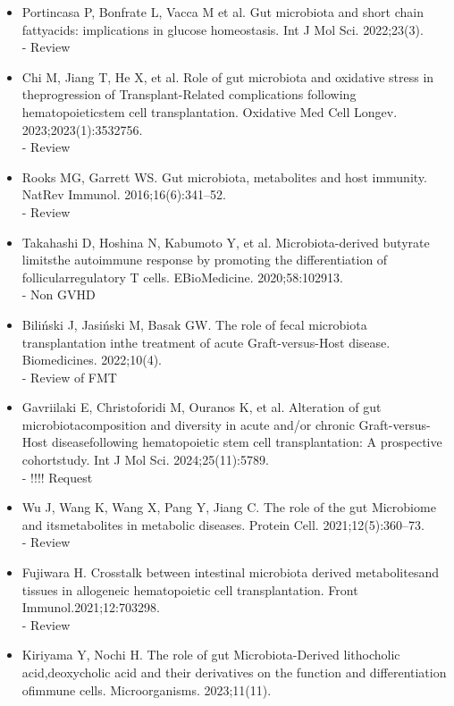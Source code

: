 \documentclass[11pt,a4paper]{article}
\begin{document}
\begin{itemize}
    - PRJNA929702 \\
    - Pediatric
    \item  Portincasa P, Bonfrate L, Vacca M et al. Gut microbiota and short chain fattyacids: implications in glucose homeostasis. Int J Mol Sci. 2022;23(3).\\
    - Review
    \item  Chi M, Jiang T, He X, et al. Role of gut microbiota and oxidative stress in theprogression of Transplant-Related complications following hematopoieticstem cell transplantation. Oxidative Med Cell Longev. 2023;2023(1):3532756.\\
    - Review
    \item  Rooks MG, Garrett WS. Gut microbiota, metabolites and host immunity. NatRev Immunol. 2016;16(6):341–52.\\
    - Review
    \item  Takahashi D, Hoshina N, Kabumoto Y, et al. Microbiota-derived butyrate limitsthe autoimmune response by promoting the differentiation of follicularregulatory T cells. EBioMedicine. 2020;58:102913.\\
    - Non GVHD
    \item  Biliński J, Jasiński M, Basak GW. The role of fecal microbiota transplantation inthe treatment of acute Graft-versus-Host disease. Biomedicines. 2022;10(4).\\
    - Review of FMT
    \item  Gavriilaki E, Christoforidi M, Ouranos K, et al. Alteration of gut microbiotacomposition and diversity in acute and/or chronic Graft-versus-Host diseasefollowing hematopoietic stem cell transplantation: A prospective cohortstudy. Int J Mol Sci. 2024;25(11):5789.\\
    - !!!! Request
    \item  Wu J, Wang K, Wang X, Pang Y, Jiang C. The role of the gut Microbiome and itsmetabolites in metabolic diseases. Protein Cell. 2021;12(5):360–73.\\
    - Review
    \item  Fujiwara H. Crosstalk between intestinal microbiota derived metabolitesand tissues in allogeneic hematopoietic cell transplantation. Front Immunol.2021;12:703298.\\
    - Review
    \item  Kiriyama Y, Nochi H. The role of gut Microbiota-Derived lithocholic acid,deoxycholic acid and their derivatives on the function and differentiation ofimmune cells. Microorganisms. 2023;11(11).\\

\end{itemize}
\end{document}
